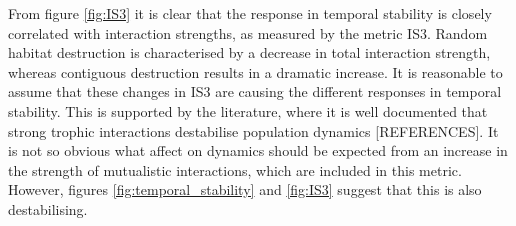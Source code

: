 From figure \ref{fig:IS3} it is clear that the response in temporal stability is closely correlated with interaction strengths, as measured by the metric IS3. Random habitat destruction is characterised by a decrease in total interaction strength, whereas contiguous destruction results in a dramatic increase. It is reasonable to assume that these changes in IS3 are causing the different responses in temporal stability. This is supported by the literature, where it is well documented that strong trophic interactions destabilise population dynamics [REFERENCES]. It is not so obvious what affect on dynamics should be expected from an increase in the strength of mutualistic interactions, which are included in this metric. However, figures \ref{fig:temporal_stability} and \ref{fig:IS3} suggest that this is also destabilising.

